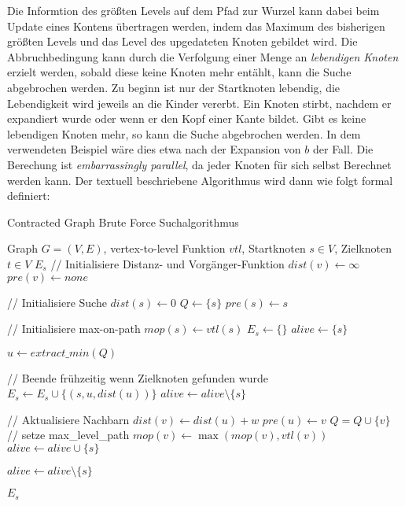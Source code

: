 Die Informtion des größten Levels auf dem Pfad zur Wurzel kann dabei beim Update eines Kontens übertragen werden, indem das Maximum des bisherigen größten Levels und das Level des upgedateten Knoten gebildet wird.
Die Abbruchbedingung kann durch die Verfolgung einer Menge an \emph{lebendigen Knoten} erzielt werden, sobald diese keine Knoten mehr entählt, kann die Suche abgebrochen werden.
Zu beginn ist nur der Startknoten lebendig, die Lebendigkeit wird jeweils an die Kinder vererbt.
Ein Knoten stirbt, nachdem er expandiert wurde oder wenn er den Kopf einer Kante bildet.
Gibt es keine lebendigen Knoten mehr, so kann die Suche abgebrochen werden.
In dem verwendeten Beispiel wäre dies etwa nach der Expansion von $b$ der Fall.
Die Berechung ist \emph{embarrassingly parallel}, da jeder Knoten für sich selbst Berechnet werden kann.
Der textuell beschriebene Algorithmus wird dann wie folgt formal definiert:

\begin{algorithm}[ht]
  \caption{Contracted Graph Brute Force Suchalgorithmus}
  \begin{algorithmic}[1]
    \Require Graph $G = (V, E)$, vertex-to-level Funktion ${vtl}$, Startknoten $s \in V$, Zielknoten $t \in V$
    \Ensure $E_s$
    \State // Initialisiere Distanz- und Vorgänger-Funktion
    \State ${dist}(v) \leftarrow \infty$
    \State ${pre}(v) \leftarrow {none}$
    \EndFor

    \State
    \State // Initialisiere Suche
    \State ${dist}(s) \leftarrow 0$
    \State $Q\leftarrow \{ s \}$
    \State ${pre}(s) \leftarrow s$

    \State
    \State // Initialisiere max-on-path
    \State ${mop}(s) \leftarrow {vtl}(s)$
    \State $E_s \leftarrow \{ \}$
    \State ${alive} \leftarrow \{ s \}$

    \State
    \State $u \leftarrow{extract\_min}(Q)$\label{graphs:dijkstra:pop}

    \State
    \State // Beende frühzeitig wenn Zielknoten gefunden wurde
    \State $E_s \leftarrow E_s \cup \{ (s, u, {dist}(u)) \}$
    \State ${alive} \leftarrow {alive} \setminus \{ s \}$
    \EndIf

    \State
    \State // Aktualisiere Nachbarn
    \State ${dist}(v) \leftarrow {dist}(u) + w$
    \State ${pre}(u) \leftarrow v$
    \State $Q = Q \cup \{ v \}$
    \State
    \State // setze max\_level\_path
    \State ${mop}(v) \leftarrow \max({mop}(v), {vtl}(v))$
    \State ${alive} \leftarrow {alive} \cup \{ s \}$
    \EndIf
    \EndIf
    \EndFor

    \State ${alive} \leftarrow {alive} \setminus \{ s \}$

    \EndWhile

    \State
    \State \Return $E_s$
  \end{algorithmic}
\end{algorithm}

